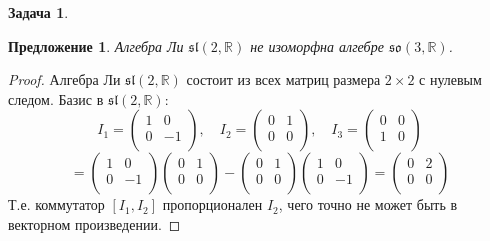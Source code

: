 \documentclass[12pt]{article}
\newtheorem{predl}[theorem]{Предложение}
\theoremstyle{definition}
\newtheorem{zad}{Задача}[section]
\begin{document}
\begin{zad}
\begin{itemize}
\begin{predl}
        Алгебра Ли $\mathfrak{sl}(2,\mathbb{R})$ не изоморфна алгебре $\mathfrak{so}(3,\mathbb{R})$.
    \end{predl}
    \begin{proof}
        Алгебра Ли $\mathfrak{sl}(2,\mathbb{R})$ состоит из всех матриц размера $2\times2$ с нулевым следом. Базис в $\mathfrak{sl}(2,\mathbb{R})$:
        \begin{equation}
            I_1=\left(
        \begin{array}{cc}
        1 & 0\\
        0 & -1\\
        \end{array}
        \right),\quad I_2=\left(
        \begin{array}{cc}
        0 & 1\\
        0 & 0\\
        \end{array}
        \right),\quad I_3=\left(
        \begin{array}{cc}
        0 & 0\\
        1 & 0\\
        \end{array}
        \right)
        \end{equation}
        \begin{equation}
            [I_1,I_2]=\left(
        \begin{array}{cc}
        1 & 0\\
        0 & -1\\
        \end{array}
        \right)\left(
        \begin{array}{cc}
        0 & 1\\
        0 & 0\\
        \end{array}
        \right)-\left(
        \begin{array}{cc}
        0 & 1\\
        0 & 0\\
        \end{array}
        \right)\left(
        \begin{array}{cc}
        1 & 0\\
        0 & -1\\
        \end{array}
        \right)=\left(
        \begin{array}{cc}
        0 & 2\\
        0 & 0\\
        \end{array}
        \right)
        \end{equation}
        Т.е. коммутатор $[I_1,I_2]$ пропорционален $I_2$, чего точно не может быть в векторном произведении.
    \end{proof}
\end{itemize}
\end{zad}
\end{document}
